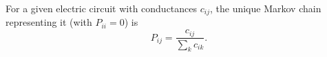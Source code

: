 For a given electric circuit with conductances $c_{ij}$, the unique Markov chain representing it (with $P_{ii} = 0$) is
$$P_{ij} = \frac{c_{ij}}{\sum_k c_{ik}}.$$
